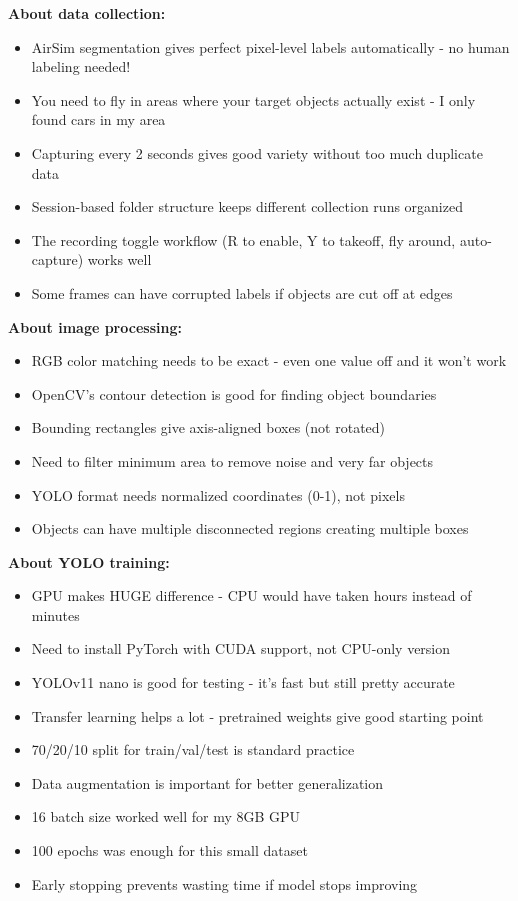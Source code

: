 \textbf{About data collection:}
\begin{itemize}
	\item AirSim segmentation gives perfect pixel-level labels automatically - no human labeling needed!
	\item You need to fly in areas where your target objects actually exist - I only found cars in my area
	\item Capturing every 2 seconds gives good variety without too much duplicate data
	\item Session-based folder structure keeps different collection runs organized
	\item The recording toggle workflow (R to enable, Y to takeoff, fly around, auto-capture) works well
	\item Some frames can have corrupted labels if objects are cut off at edges
\end{itemize}

\textbf{About image processing:}
\begin{itemize}
	\item RGB color matching needs to be exact - even one value off and it won't work
	\item OpenCV's contour detection is good for finding object boundaries
	\item Bounding rectangles give axis-aligned boxes (not rotated)
	\item Need to filter minimum area to remove noise and very far objects
	\item YOLO format needs normalized coordinates (0-1), not pixels
	\item Objects can have multiple disconnected regions creating multiple boxes
\end{itemize}

\textbf{About YOLO training:}
\begin{itemize}
	\item GPU makes HUGE difference - CPU would have taken hours instead of minutes
	\item Need to install PyTorch with CUDA support, not CPU-only version
	\item YOLOv11 nano is good for testing - it's fast but still pretty accurate
	\item Transfer learning helps a lot - pretrained weights give good starting point
	\item 70/20/10 split for train/val/test is standard practice
	\item Data augmentation is important for better generalization
	\item 16 batch size worked well for my 8GB GPU
	\item 100 epochs was enough for this small dataset
	\item Early stopping prevents wasting time if model stops improving
\end{itemize}

